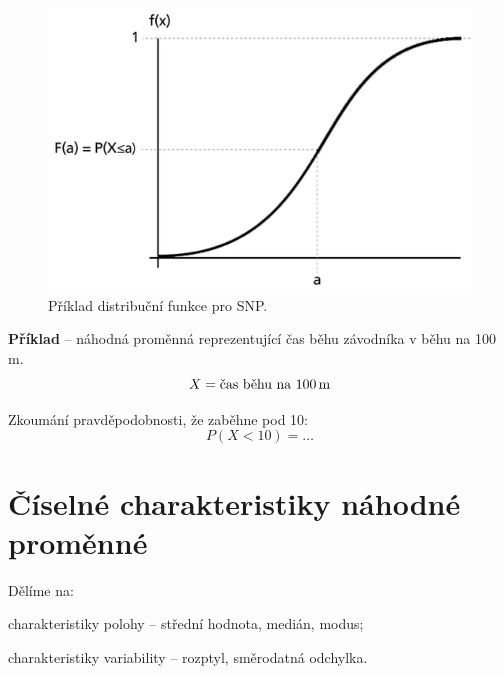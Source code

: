 \begin{compactitem}
    \begin{figure}[H]
        \centering
        \includegraphics[width=0.5\linewidth]{snp_distribution_function.png}
        \caption{Příklad distribuční funkce pro SNP.}
    \end{figure}

    \item \textbf{Příklad} -- náhodná proměnná reprezentující čas běhu závodníka v běhu na 100\,m.
    $$ X = \text{čas běhu na 100\,m} $$ \begin{compactitem}
        \item Zkoumání pravděpodobnosti, že zaběhne pod 10:
        $$ P(X < 10) = \ldots$$
    \end{compactitem}

\end{compactitem}


\section{Číselné charakteristiky náhodné proměnné}

\begin{compactitem}
    \item Dělíme na: \begin{compactitem}
        \item charakteristiky polohy -- střední hodnota, medián, modus;
        \item charakteristiky variability -- rozptyl, směrodatná odchylka.
    \end{compactitem}
\end{compactitem}

